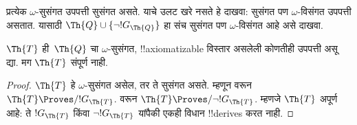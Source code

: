 \documentclass[../../../include/open-logic-section]{subfiles}
\begin{document}
\begin{prob}
  प्रत्येक $\omega$-सुसंगत उपपत्ती
  सुसंगत असते. याचे उलट खरे नसते
  हे दाखवा: सुसंगत पण
  $\omega$-विसंगत उपपत्ती असतात.
  यासाठी $\Th{Q} \cup
  \{\lnot !G_\Th{Q}\}$ हा संच
  सुसंगत पण $\omega$-विसंगत
  आहे असे दाखवा.
\end{prob}

\begin{thm}
$\Th{T}$ ही~$\Th{Q}$ चा
$\omega$-सुसंगत,
!!{axiomatizable} विस्तार असलेली
कोणतीही उपपत्ती असू द्या.
मग $\Th{T}$ संपूर्ण नाही.
\end{thm}

\begin{proof}
  $\Th{T}$ हे $\omega$-सुसंगत
  असेल, तर ते सुसंगत असते.
  म्हणून 
  वरून $\Th{T}
  \Proves/ !G_\Th{T}$.
  वरून $\Th{T} \Proves/
  \lnot !G_\Th{T}$. म्हणजे
  $\Th{T}$ अपूर्ण आहे: ते
  $!G_\Th{T}$ किंवा
  $\lnot !G_\Th{T}$ यांपैकी
  एकही विधान !!{derive}s करत नाही.
\end{proof}
\end{document}
